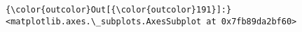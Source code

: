 \documentclass[11pt]{article}
\begin{document}
\begin{Verbatim}[commandchars=\\\{\}]
{\color{outcolor}Out[{\color{outcolor}191}]:} <matplotlib.axes.\_subplots.AxesSubplot at 0x7fb89da2bf60>
\end{Verbatim}
            
    \begin{center}
    \end{center}
    { \hspace*{\fill} \\}
    

    
    
    
    
\end{document}
